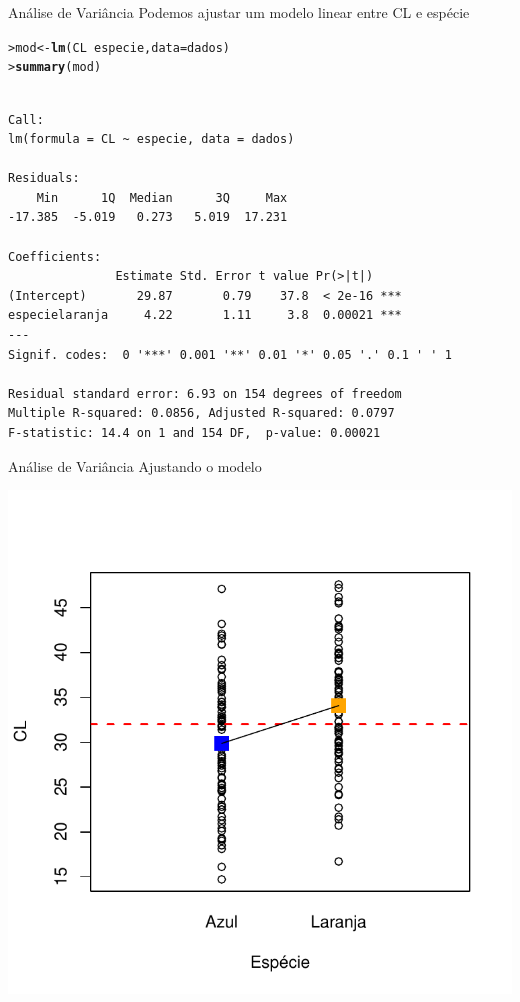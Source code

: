 \documentclass[10pt]{beamer}\usepackage{graphicx, color}
\makeatletter
\newcommand{\hlfunctioncall}[1]{\textcolor[rgb]{0,0,0.545098039215686}{\textbf{#1}}}%
\newenvironment{kframe}{%
 \def\at@end@of@kframe{}%
 \ifinner\ifhmode%
  \def\at@end@of@kframe{\end{minipage}}%
  \begin{minipage}{\columnwidth}%
 \fi\fi%
 \def\FrameCommand##1{\hskip\@totalleftmargin \hskip-\fboxsep
 \colorbox{shadecolor}{##1}\hskip-\fboxsep
     \hskip-\linewidth \hskip-\@totalleftmargin \hskip\columnwidth}%
 \MakeFramed {\advance\hsize-\width
   \@totalleftmargin\z@ \linewidth\hsize
   \@setminipage}}%
 {\par\unskip\endMakeFramed%
 \at@end@of@kframe}
\newenvironment{knitrout}{}{} %
\makeatother
\begin{document}
\begin{frame}[fragile=singleslide]{Análise de Variância}
Podemos ajustar um modelo linear entre CL e espécie
\begin{knitrout}\footnotesize
{}\color{fgcolor}\begin{kframe}
\begin{alltt}
> mod <- \hlfunctioncall{lm}(CL ~ especie, data = dados)
> \hlfunctioncall{summary}(mod)
\end{alltt}
\begin{verbatim}

Call:
lm(formula = CL ~ especie, data = dados)

Residuals:
    Min      1Q  Median      3Q     Max 
-17.385  -5.019   0.273   5.019  17.231 

Coefficients:
               Estimate Std. Error t value Pr(>|t|)    
(Intercept)       29.87       0.79    37.8  < 2e-16 ***
especielaranja     4.22       1.11     3.8  0.00021 ***
---
Signif. codes:  0 '***' 0.001 '**' 0.01 '*' 0.05 '.' 0.1 ' ' 1 

Residual standard error: 6.93 on 154 degrees of freedom
Multiple R-squared: 0.0856,	Adjusted R-squared: 0.0797 
F-statistic: 14.4 on 1 and 154 DF,  p-value: 0.00021 

\end{verbatim}
\end{kframe}
\end{knitrout}

\end{frame}

\begin{frame}[fragile=singleslide]{Análise de Variância}
Ajustando o modelo
\begin{knitrout}\small
{}\color{fgcolor}

{\centering \includegraphics[width=.7\textwidth]{figure/unnamed-chunk-25} 

}


\end{knitrout}

\end{frame}
\end{document}
